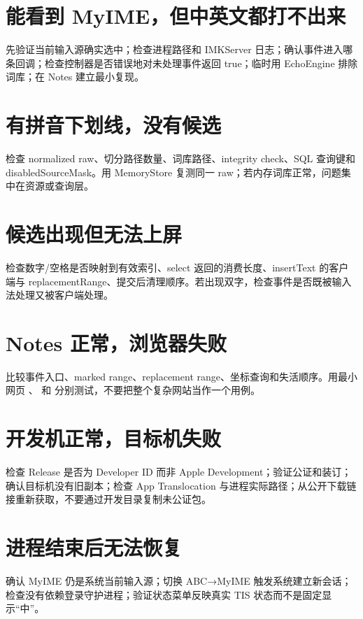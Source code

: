 \section{能看到 MyIME，但中英文都打不出来}

先验证当前输入源确实选中；检查进程路径和 IMKServer 日志；确认事件进入哪条回调；检查控制器是否错误地对未处理事件返回 true；临时用 EchoEngine 排除词库；在 Notes 建立最小复现。

\section{有拼音下划线，没有候选}

检查 normalized raw、切分路径数量、词库路径、integrity check、SQL 查询键和 disabledSourceMask。用 MemoryStore 复测同一 raw；若内存词库正常，问题集中在资源或查询层。

\section{候选出现但无法上屏}

检查数字/空格是否映射到有效索引、select 返回的消费长度、insertText 的客户端与 replacementRange、提交后清理顺序。若出现双字，检查事件是否既被输入法处理又被客户端处理。

\section{Notes 正常，浏览器失败}

比较事件入口、marked range、replacement range、坐标查询和失活顺序。用最小网页 、 和  分别测试，不要把整个复杂网站当作一个用例。

\section{开发机正常，目标机失败}

检查 Release 是否为 Developer ID 而非 Apple Development；验证公证和装订；确认目标机没有旧副本；检查 App Translocation 与进程实际路径；从公开下载链接重新获取，不要通过开发目录复制未公证包。

\section{进程结束后无法恢复}

确认 MyIME 仍是系统当前输入源；切换 ABC→MyIME 触发系统建立新会话；检查没有依赖登录守护进程；验证状态菜单反映真实 TIS 状态而不是固定显示“中”。


